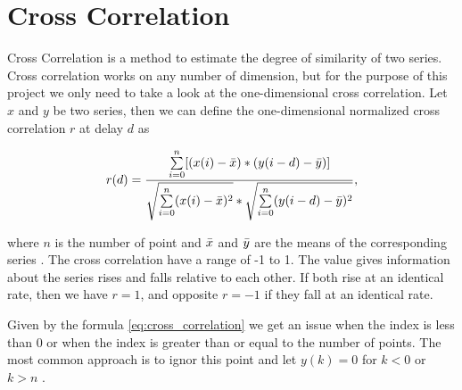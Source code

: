 \section{Cross Correlation}
Cross Correlation is a method to estimate the degree of similarity of two series. Cross correlation works on any number of dimension, but for the purpose of this project we only need to take a look at the one-dimensional cross correlation. Let $x$ and $y$ be two series, then we can define the one-dimensional normalized cross correlation $r$ at delay $d$ as	

\begin{equation}
\label{eq:cross_correlation}
    r(d) = \frac{\sum\limits_{i=0}\limits^{n} [(x(i) - \bar{x}) * (y(i-d) - \bar{y})]}{\sqrt{\sum\limits_{i=0}\limits^{n} (x(i) - \bar{x})^{2}} * \sqrt{\sum\limits_{i=0}\limits^{n} (y(i-d) - \bar{y})^{2}}},
\end{equation}

where $n$ is the number of point and $\bar{x}$ and $\bar{y}$ are the means of the corresponding series \cite{cross_correlation_theory}. The cross correlation have a range of -1 to 1. The value gives information about the series rises and falls relative to each other. If both rise at an identical rate, then we have $r = 1$, and opposite $r = -1$ if they fall at an identical rate. 

Given by the formula \ref{eq:cross_correlation} we get an issue when the index is less than 0 or when the index is greater than or equal to the number of points. The most common approach is to ignor this point and let $y(k) = 0$ for $k < 0$ or $k > n$ \cite{cross_correlation_code}.